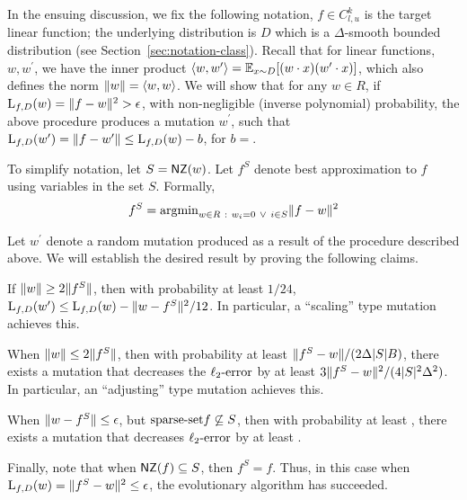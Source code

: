 In the ensuing discussion, we fix the following notation, $f \in C^k_{l, u}$ is
the target linear function; the underlying distribution is $D$ which is a
$\Delta$-smooth bounded distribution (see Section~\ref{sec:notation-class}). Recall
that for linear functions, $w, w^\prime$, we have the inner product
$\langle w, w^\prime \rangle = \mathbb{E}_{x \sim D}[(w \cdot x) (w^\prime \cdot x)]$, which also
defines the norm $\Vert w \Vert = \langle w, w \rangle$.  We will show that for any $w \in
R$, if $\mathrm{L}_{f, D}(w) = \Vert f - w \Vert^2 > \epsilon$, with non-negligible
(inverse polynomial) probability, the above procedure produces a mutation
$w^\prime$, such that $\mathrm{L}_{f, D}(w^\prime) = \Vert f - w^\prime \Vert \leq
\mathrm{L}_{f, D}(w) - b$, for $b = $. 

To simplify notation, let $S = \mathsf{NZ}(w)$. Let $f^S$ denote best approximation to
$f$ using variables in the set $S$. Formally, 
\[ 
f^S = \mathrm{argmin}_{w \in R ~:~	w_i = 0 ~\vee~ i \in S} \Vert f- w \Vert^2 
\]

Let $w^\prime$ denote a random mutation produced as a result of the procedure
described above.  We will establish the desired result by proving the following
claims.
\begin{claim} \label{claim:apple} If $\Vert w \Vert \geq 2 \Vert f^S \Vert$, then
with probability at least $1/24$, $\mathrm{L}_{f, D}(w^\prime) \leq \mathrm{L}_{f, D}(w) -
\Vert w - f^S \Vert^2/12$. In particular, a ``scaling'' type mutation achieves
this. \end{claim}
\begin{claim} \label{claim:banana} When $\Vert w \Vert \leq 2 \Vert f^S \Vert$,
then with probability at least $\Vert f^S - w \Vert/(2 \Delta |S| B)$, there
exists a mutation that decreases the $\mathrm{\ell_2\mbox{-}error}$ by at least $3\Vert f^S -
w \Vert^2/(4|S|^2 \Delta^2)$. In particular, an ``adjusting'' type mutation achieves
this. \end{claim}
\begin{claim} \label{claim:cantaloupe} When $\Vert w - f^S \Vert \leq \epsilon$, but
$\mathrm{sparse\mbox{-}set}{f} \not\subseteq S$, then with probability at least , there exists a mutation that decreases
$\mathrm{\ell_2\mbox{-}error}$ by at least . \end{claim}

Finally, note that when $\mathsf{NZ}(f) \subseteq S$, then $f^S = f$. Thus, in this case
when $\mathrm{L}_{f, D}(w) = \Vert f^S - w \Vert^2 \leq \epsilon$, the evolutionary
algorithm has succeeded. \medskip 

